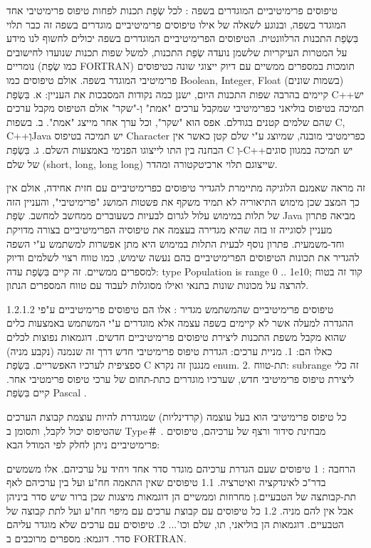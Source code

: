 \begin{טבלא}[!htbp]
      טיפוסים פרימיטיביים המוגדרים בשפה :
      לכל שְׂפַת תכנות לפחות טיפוס פרימיטיבי אחד המוגדר בשפה, ובנוגע לשאלה של אילו טיפוסים פרימיטיביים מוגדרים בשפה זה כבר תלוי בִּשְׂפַת התכנות הרלוונטית. הטיפוסים הפרימיטיביים המוגדרים בשפה יכולים לחשוף לנו מידע על המטרות העיקריות שלשמן נועדה שְׂפַת התכנות, למשל שפות תכנות שנועדו לחישובים נומריים (כמו שְׂפַת FORTRAN) תומכות במספרים ממשיים עם דיוק ייצוגי שונה כטיפוסים פרימיטיבי המוגדר בשפה.
      אולם טיפוסים כמו Boolean, Integer, Float (בשמות שונים) קיימים בהרבה שפות התכנות היום, ישנן כמה נקודות המסבכות את העניין:
      א. בִּשְׂפַת C++יש תמיכה בטיפוס בוליאני כפרימיטיבי שמקבל ערכים "אמת" וְ-"שקר" אולם הטיפוס מקבל ערכים שהם שלמים קטנים בגודלם. אפס הוא "שקר", וכל ערך אחר מייצג "אמת".
      ב. בשפות C, C++וְJava יש תמיכה בטיפוס Character כפרימטיבי מובנה, שמיוצג ע"י שלם קטן כאשר אין הבחנה בין התו לייצוגו הפנימי באמצעות השלם.
      ג. בִּשְׂפַת C וְ-C++יש תמיכה במגוון סוגים של שלם (short, long, long long) שייצוגם תלוי ארכיטקטורה ומהדר.

      זה מראה שאמנם הלוגיקה מתיימרת להגדיר טיפוסים כפרימיטיביים עם חזית אחידה, אולם אין כך המצב שכן מימוש התיאוריה לא תמיד משקף את פשטות המושג "פרימיטיבי", והעניין הזה של תלות במימוש עלול לגרום לבעיות כשעוברים ממחשב למחשב. שְׂפַת Java מביאה פתרון מעניין לסוגייה זו בזה שהיא מגדירה בעצמה את טיפוסיה הפרימיטיביים בצורה מדויקת וחד-משמעית. פתרון נוסף לבעית התלות במימוש היא מתן אפשרות למשתמש ע"י השפה להגדיר את תכונות הטיפוסים הפרימיטיביים בהם נעשה שימוש, כמו טווח רצוי לשלמים ודיוק למספרים ממשיים. זה קיים בִּשְׂפַת עדה:
      type Population is range 0 .. 1e10;
      קוד זה בטוח להרצה על מכונות שונות בתנאי ואילו מסוגלות לעבוד עם טווח המספרים הנתון.

      1.2.1.2 טיפוסים פרימיטיביים שהמשתמש מגדיר :
      אלו הם טיפוסים פרימיטיביים ע"פי ההגדרה למעלה אשר לא קיימים בשפה עצמה אלא
      מוגדרים ע"י המשתמש באמצעות כלים שהוא מקבל משפת התכנות ליצירת טיפוסים
      פרימיטיביים חדשים. דוגמאות נפוצות לכלים כאלו הם:
      1. מניית ערכים: הגדרת טיפוס פרימיטיבי חדש דרך זה שנמנה (נקבע מניה) ספציפית לערכיו האפשריים. בִּשְׂפַת C מנגנון זה נקרא enum.
      2. תת-טווח: subrange זה כלי ליצירת טיפוס פרימיטיבי חדש, שערכיו מוגדרים כתת-תחום של ערכי טיפוס פרימטיבי אחר. קיים בִּשְׂפַת Pascal .

      כל טיפוס פרימיטיבי הוא בעל עוצמה (קרדינליות) שמוגדרת להיות עוצמת קבוצת הערכים שהטיפוס יכול לקבל, ותסומן ב Type＃ .
      מבחינת סידור ורצף של ערכיהם, טיפוסים פרימיטיביים ניתן לחלק לפי המודל הבא:

      הרחבה :
      1 טיפוסים שעם הגדרת ערכיהם מוגדר סדר אחד ויחיד על ערכיהם. אלו משמשים בדר"כ לאינדקציה ואיטרציה.
      1.1 טיפוסים שאין התאמה חח"ע ועל בין ערכיהם לאף תת-קבותצה של הטבעיים.ן מחרוזות וממשיים הן דוגמאות מיצגות שכן ברור שיש סדר ביניהן אבל אין להם מניה.
      1.2 כל טיפוסים עם קבוצת ערכים עם מיפוי חח"ע ועל לתת קבוצה של הטבעיים. דוגמאות הן בוליאני, תו, שלם וכו'...
      2. טיפוסים עם ערכים שלא מוגדר עליהם סדר. דוגמא: מספרים מרוכבים ב FORTRAN.


\end{טבלא}
